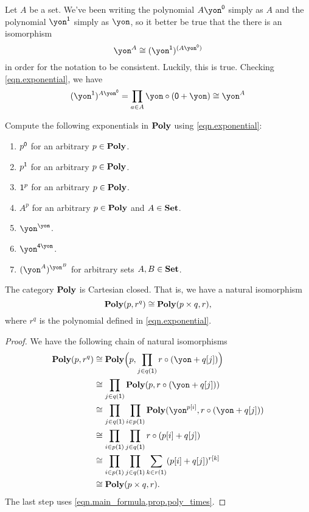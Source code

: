 \documentclass[Book-Poly]{subfiles}
\begin{document}
\begin{example}
Let $A$ be a set. We've been writing the polynomial $A\yon^\0$ simply as $A$ and the polynomial $\yon^\1$ simply as $\yon$, so it better be true that the there is an isomorphism 
\[\yon^A\cong (\yon^\1)^{(A\yon^\0)}\]
in order for the notation to be consistent. Luckily, this is true. Checking \eqref{eqn.exponential}, we have
\[(\yon^\1)^{A\yon^\0}=\prod_{a\in A}\yon\circ(\0+\yon)\cong\yon^A\]
\end{example}

\begin{exercise}
Compute the following exponentials in $\mathbf{Poly}$ using \eqref{eqn.exponential}:
\begin{enumerate}
	\item $p^{\textsf{0}}$ for an arbitrary $p\in\mathbf{Poly}$.
	\item $p^{\textsf{1}}$ for an arbitrary $p\in\mathbf{Poly}$.
	\item $\textsf{1}^p$ for an arbitrary $p\in\mathbf{Poly}$.
	\item $A^p$ for an arbitrary $p\in\mathbf{Poly}$ and $A\in\mathbf{Set}$.
	\item $\yon^\yon$.
	\item $\yon^{\4\yon}$.
	\item $(\yon^A)^{\yon^B}$ for arbitrary sets $A,B\in\mathbf{Set}$.
\qedhere
\end{enumerate}
\end{exercise}


\begin{theorem}\label{thm.poly_cart_closed}
The category $\mathbf{Poly}$ is Cartesian closed. That is, we have a natural isomorphism
\[
  \mathbf{Poly}(p,r^q)\cong\mathbf{Poly}(p\times q,r),
\]
where $r^q$ is the polynomial defined in \eqref{eqn.exponential}.
\end{theorem}
\begin{proof}
We have the following chain of natural isomorphisms
\begin{align*}
	\poly(p,r^q)&\cong
	\poly\Big(p,\prod_{j\in q(\1)}r\circ (\yon+q[j])\Big)\\&\cong
	\prod_{j\in q(\1)}\poly(p,r\circ(\yon+q[j]))\\&\cong
	\prod_{j\in q(\1)}\prod_{i\in p(\1)}\poly(\yon^{p[i]},r\circ(\yon+q[j]))\\&\cong
	\prod_{i\in p(\1)}\prod_{j\in q(\1)}r\circ(p[i]+q[j])\\&\cong
	\prod_{i\in p(\1)}\prod_{j\in q(\1)}\sum_{k\in r(\1)}(p[i]+q[j])^{r[k]}\\&\cong
	\poly(p\times q,r).
\end{align*}
The last step uses \eqref{eqn.main_formula,prop.poly_times}.
\end{proof}
\end{document}
